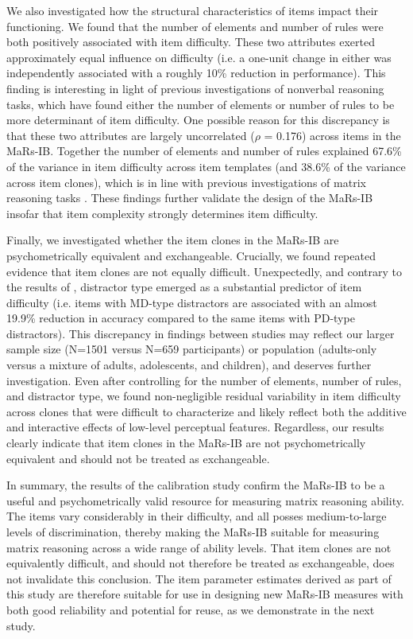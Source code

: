 \documentclass[a4paper,man,natbib]{apa6}
\begin{document}
We also investigated how the structural characteristics of items impact their functioning. We found that the number of elements and number of rules were both positively associated with item difficulty. These two attributes exerted approximately equal influence on difficulty (i.e. a one-unit change in either was independently associated with a roughly 10\% reduction in performance). This finding is interesting in light of previous investigations of nonverbal reasoning tasks, which have found either the number of elements \citep{bethell1984adaptive} or number of rules \citep{mulholland1980components} to be more determinant of item difficulty. One possible reason for this discrepancy is that these two attributes are largely uncorrelated ($\rho$ = 0.176) across items in the MaRs-IB. Together the number of elements and number of rules explained 67.6\% of the variance in item difficulty across item templates (and 38.6\% of the variance across item clones), which is in line with previous investigations of matrix reasoning tasks \citep{carpenter1990one, matzen1994error}. These findings further validate the design of the MaRs-IB insofar that item complexity strongly determines item difficulty.

Finally, we investigated whether the item clones in the MaRs-IB are psychometrically equivalent and exchangeable. Crucially, we found repeated evidence that item clones are not equally difficult. Unexpectedly, and contrary to the results of \cite{chierchia2019matrix}, distractor type emerged as a substantial predictor of item difficulty (i.e. items with MD-type distractors are associated with an almost 19.9\% reduction in accuracy compared to the same items with PD-type distractors). This discrepancy in findings between studies may reflect our larger sample size (N=1501 versus N=659 participants) or population (adults-only versus a mixture of adults, adolescents, and children), and deserves further investigation. Even after controlling for the number of elements, number of rules, and distractor type, we found non-negligible residual variability in item difficulty across clones that were difficult to characterize and likely reflect both the additive and interactive effects of low-level perceptual features. Regardless, our results clearly indicate that item clones in the MaRs-IB are not psychometrically equivalent and should not be treated as exchangeable. 

In summary, the results of the calibration study confirm the MaRs-IB to be a useful and psychometrically valid resource for measuring matrix reasoning ability. The items vary considerably in their difficulty, and all posses medium-to-large levels of discrimination, thereby making the MaRs-IB suitable for measuring matrix reasoning across a wide range of ability levels. That item clones are not equivalently difficult, and should not therefore be treated as exchangeable, does not invalidate this conclusion. The item parameter estimates derived as part of this study are therefore suitable for use in designing new MaRs-IB measures with both good reliability and potential for reuse, as we demonstrate in the next study. 
\end{document}
